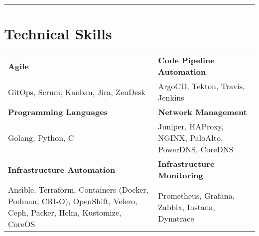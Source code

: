 \documentclass[letterpaper]{article}
\begin{document}
\textcolor{blue}{\rule{\linewidth}{1pt}}

\vspace{0.5em}

\begin{minipage}{\dimexpr\textwidth-1in\relax}
\section*{Technical Skills}
\hspace{0.25in}
\begin{tabularx}{\textwidth}{@{}X@{\hskip\tabcolsep}X@{}}
\textbf{Agile} & \textbf{Code Pipeline Automation}\\
GitOps, Scrum, Kanban, Jira, ZenDesk & ArgoCD, Tekton, Travis, Jenkins\\
\textbf{Programming Languages} &  \textbf{Network Management}\\
Golang, Python, C & Juniper, HAProxy, NGINX, PaloAlto, PowerDNS, CoreDNS \\
\textbf{Infrastructure Automation} & \textbf{Infrastructure Monitoring}\\
Ansible, Terraform, Containers (Docker, Podman, CRI-O), OpenShift, Velero, Ceph, Packer, Helm, Kustomize, CoreOS & Prometheus, Grafana, Zabbix, Instana, Dynatrace
\end{tabularx}
\end{minipage}
\end{document}
